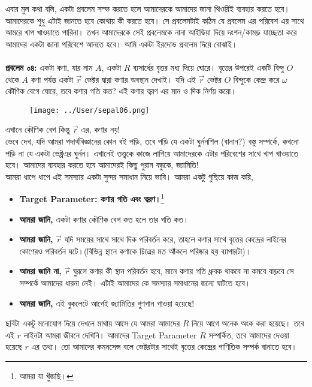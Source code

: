 \documentclass[12pt,a4paper]{article}
\begin{document}
এবার মুল কথা বলি, একটা প্রবলেম সল্ভ করতে হলে আমাদেরকে আমাদের জানা থিওরিই ব্যবহার করতে হবে। আমাদেরকে শুধু এটাই জানতে হবে কোথায় কী করতে হবে। সে প্রবলেমটাই কঠিন যে প্রবলেম এর পরিবেশ এর সাথে আমরে খাপ খাওয়াতে পারিনা। তখন আমাদেরকে সেই প্রবলেমকে নানা আইডিয়া দিয়ে দংশন/কামড় যাচ্ছেতা করে আমাদের একটা জানা পরিবেশে আনতে হবে। আমি একটা ইরদোভ প্রবলেম দিয়ে বোঝাই।\\
\\
%
\textbf{প্রবলেম ০৪:} একটা কণা, যার নাম $A$, একটা $R$ ব্যসার্ধের বৃত্তর মধ্য দিয়ে ঘোরে। বৃত্তের উপরেই একটি বিন্দু $O$ থেকে $A$ কণা পর্যন্ত একটা $\vec{r}$ ভেক্টর দ্বারা কণার অবস্থান দেখাই। যদি এই $\vec{r}$ ভেক্টর $O$ বিন্দুকে কেন্দ্র করে $\omega$ কৌণিক বেগে ঘোরে, তবে কণার গতি কত? এই কণার ত্বরণ এর মান ও দিক নির্ণয় করো।\\
%
\begin{figure}[hbtp]
\centering
\texttt{[image: ../User/sepal06.png]}
\end{figure}
এখানে কৌণিক বেগ কিন্তু $\vec{r}$ এর, কণার নয়! \\
ভেবে দেখ, যদি আমরা পদার্থবিজ্ঞানের কোন বই পড়ি, তবে পড়ি যে একটা ঘুর্ননশিল (বানান?) বস্তু সম্পর্কে, কখনো পড়ি না যে একটা ভেক্ট্রএর ঘুর্নন। এখানেই তত্ত্বকে কাজে লাগিয়ে আমাদেরকে এটার পরিবেশের সাথে খাপ খাওয়াতে হবে। আমাদের ব্যবহার করতে হবে আমাদেরই কিছু পুরান বন্ধুকে, জ্যামিতি!\\
আমরা ধাপে ধাপে এই সমস্যার একটা সুন্দর সমাধান নিয়ে ভাবি। আমরা একটু গুছিয়ে কাজ করি,
\begin{itemize}
\item \textbf{Target Parameter: কণার গতি এবং ত্বরণ।}\footnote{আমরা যা খুঁজছি।}
\item \textbf{আমরা জানি,} একটা কণার কৌণিক বেগ কত হলে তার গতি কত। 
\item \textbf{আমরা জানি,} $\vec{r}$ যদি সময়ের সাথে সাথে দিক পরিবর্তন করে, তাহলে কণার সাথে বৃত্তের কেন্দ্রের লাইনের কোণেরও পরিবর্তন ঘটে।(বিভিন্ন স্থানে কণাকে চিত্রের মত আঁকলে পরিষ্কার হয় ব্যাপারটা)।
\item \textbf{আমরা জানি না,} $\vec{r}$ ঘুরলে কণার কী স্থান পরিবর্তন হবে, মানে কণার গতি ধ্রুবক থাকবে না কমবে বাড়বে সে সম্পর্কে আমাদের ধারনা নেই। এটাই আমাদের কে সমস্যার সমাধানের জন্যে ঘাটতে হবে।
\item \textbf{আমরা জানি,} এই বুকলেটে আগেই জ্যামিতির গুণগান গাওয়া হয়েছে!
\end{itemize}
ছবিটা একটু মনোযোগ দিয়ে দেখলে মাথায় আসে যে আমরা আমাদের $R$ নিয়ে আগে অনেক অংক করা হয়েছে। তবে এই $r$ লাইনটা আমরা জীবনে দেখিনি। আমাদের  Target Parameter  $R$ সম্পর্কিত, তবে আমাদের দেওয়া হয়েছে $r$ এর তথ্য। তো আমাদের কমনসেন্স বলে ভেক্টরটার সাথেই বৃত্তের কেন্দ্রের গাণিতিক সম্পর্ক বানাতে হবে। \\
\end{document}
